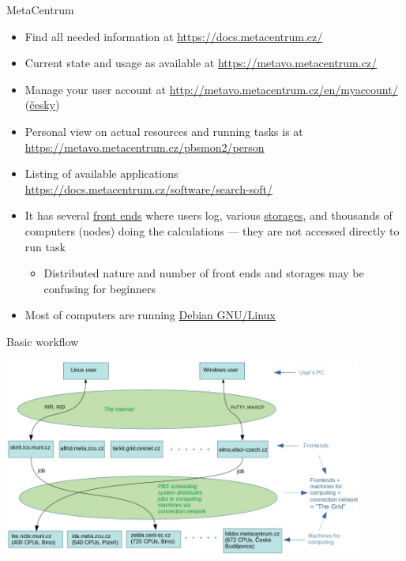 \documentclass[compress,  xelatex, 11pt, xcolor=x11names, aspectratio=169,
	hyperref={
		bookmarks=true,
		unicode=true,
		colorlinks=true,
		pdftitle={HybSeq course},
		plainpages=false,
		pdfauthor={Vojtech Zeisek},
		pdfsubject={Practical processing of HybSeq target enrichment sequencing data on computing grids like MetaCentrum},
		pdfcreator={XeLaTeX},
		pdfkeywords={BASH, command line, GNU, HybSeq, Linux, MetaCentrum, sequencing shell, target enrichment},
		linkcolor=Turquoise4, %
		anchorcolor=DodgerBlue4, %
		citecolor=DodgerBlue4, %
		filecolor=DodgerBlue4, %
		menucolor=Tan4, %
		urlcolor=DarkOliveGreen4 %
		},
	url={hyphens, lowtilde} %
	]{beamer}
\begin{document}
\begin{frame}{MetaCentrum}
	\begin{itemize}
		\item Find all needed information at \url{https://docs.metacentrum.cz/}
		\item Current state and usage as available at \url{https://metavo.metacentrum.cz/}
		\item Manage your user account at \url{http://metavo.metacentrum.cz/en/myaccount/} (\href{https://metavo.metacentrum.cz/cs/myaccount/}{česky})
		\item Personal view on actual resources and running tasks is at \url{https://metavo.metacentrum.cz/pbsmon2/person}
		\item Listing of available applications \url{https://docs.metacentrum.cz/software/search-soft/}
		\item It has several \href{https://docs.metacentrum.cz/access/log-in/}{front ends} where users log, various \href{https://docs.metacentrum.cz/data/data-within/}{storages}, and thousands of computers (nodes) doing the calculations --- they are not accessed directly to run task
		\begin{itemize}
			\item Distributed nature and number of front ends and storages may be confusing for beginners
		\end{itemize}
		\item Most of computers are running \href{https://www.debian.org/}{Debian GNU/Linux}
	\end{itemize}
\end{frame}

\begin{frame}{Basic workflow}
	\begin{center}
		\includegraphics[height=6.5cm]{grid_graphics.jpg}
	\end{center}
\end{frame}
\end{document}

